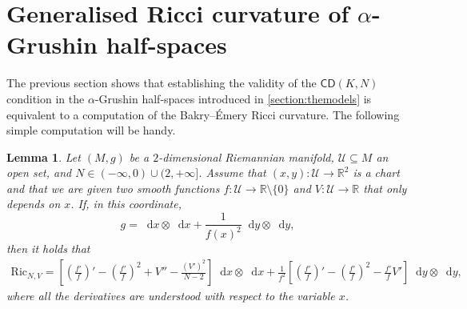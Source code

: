 \documentclass[11pt,twoside,a4paper]{article}
\newcommand*\diff{\mathop{}\!\mathrm{d}}
\newcommand{\Ric}{\mathrm{Ric}}
\theoremstyle{theorem}
\newtheorem{lemma}[theorem]{Lemma}
\theoremstyle{definition}
\theoremstyle{remark}
\theoremstyle{proof}
\begin{document}
\section{Generalised Ricci curvature of \texorpdfstring{$\alpha$}{alpha}-Grushin half-spaces}
\label{section:riccicomputation}

The previous section shows that establishing the validity of the $\mathsf{CD}(K, N)$ condition in the $\alpha$-Grushin half-spaces introduced in \cref{section:themodels} is equivalent to a computation of the Bakry--\'Emery Ricci curvature. The following simple computation will be handy.

\begin{lemma}
\label{e:Rictensor}
    Let $(M, g)$ be a $2$-dimensional Riemannian manifold, $\mathcal{U} \subseteq M$ an open set, and $N \in (-\infty, 0) \cup (2, +\infty]$. Assume that $(x, y) : \mathcal{U} \to \mathbb{R}^2$ is a chart and that we are given two smooth functions $f : \mathcal{U} \to \mathbb{R}\setminus \{0\}$ and $V : \mathcal{U} \to \mathbb{R}$ that only depends on $x$. If, in this coordinate,
    \[
    g = \diff x \otimes \diff x + \frac{1}{f(x)^2} \diff y \otimes \diff y,
    \]
    then it holds that
\begin{equation*}
        \begin{aligned}
            \Ric_{N,V} = \left[ \left(\frac{f'}{f}\right)' - \left(\frac{f'}{f}\right)^2 + V'' - \frac{(V')^2}{N - 2}\right] \diff x \otimes \diff x
            + \frac{1}{f^2}\left[\left(\frac{f'}{f}\right)' - \left(\frac{f'}{f}\right)^2 - \frac{f'}{f} V'\right] \diff y \otimes \diff y,
        \end{aligned}
\end{equation*}
where all the derivatives are understood with respect to the variable $x$.
\end{lemma}
\end{document}

